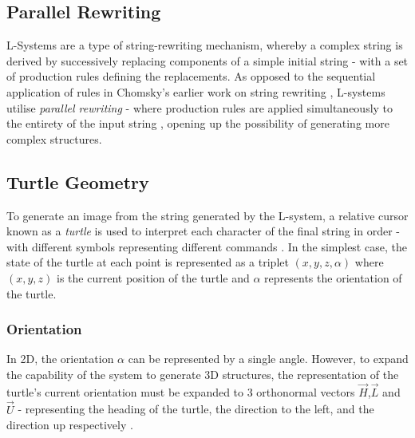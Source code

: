 \documentclass[12pt]{article}
\begin{document}
\subsection{Parallel Rewriting}
L-Systems are a type of string-rewriting mechanism, whereby a complex string is derived by successively replacing components of a simple initial string - with a set of production rules defining the replacements.  As opposed to the sequential application of rules in Chomsky's earlier work on string rewriting \cite{chomsky},  L-systems utilise \textit{parallel rewriting} - where production rules are applied simultaneously to the entirety of the input string \cite{lindenmayer}, opening up the possibility of generating more complex structures.\\
\subsection{Turtle Geometry}
To generate an image from the string generated by the L-system, a relative cursor known as a \textit{turtle} is used to interpret each character of the final string in order - with different symbols representing different commands \cite{graphical}. In the simplest case, the state of the turtle at each point is represented as a triplet \((x, y, z, \alpha)\) where \((x, y, z)\) is the current position of the turtle and \(\alpha\) represents the orientation of the turtle. 

\subsubsection{Orientation}
In 2D, the orientation \(\alpha\) can be represented by a single angle. However, to expand the capability of the system to generate 3D structures, the representation of the turtle's current orientation must be expanded to 3 orthonormal vectors \(\vec{H}\),\(\vec{L}\) and \(\vec{U}\) - representing the heading of the turtle, the direction to the left, and the direction up respectively \cite{turtle}. 
\end{document}
